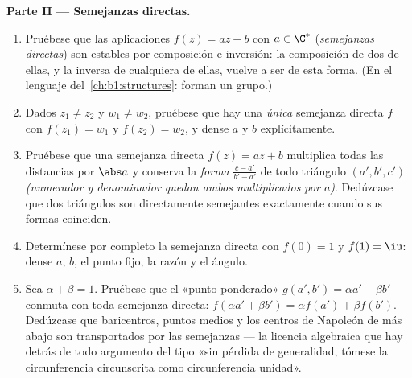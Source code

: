 \begin{problem}
\medskip
\noindent\textbf{Parte II --- Semejanzas directas.}
\begin{enumerate}[resume]
  \item Pruébese que las aplicaciones $f(z) = az + b$ con $a \in \C^*$
        (\emph{semejanzas directas}) son estables por composición e
        inversión: la composición de dos de ellas, y la inversa de
        cualquiera de ellas, vuelve a ser de esta forma. (En el
        lenguaje del~\cref{ch:b1:structures}: forman un grupo.)
  \item Dados $z_1 \neq z_2$ y $w_1 \neq w_2$, pruébese que hay una
        \emph{única} semejanza directa $f$ con $f(z_1) = w_1$ y
        $f(z_2) = w_2$, y dense $a$ y $b$ explícitamente.
  \item Pruébese que una semejanza directa $f(z) = az + b$ multiplica
        todas las distancias por $\abs a$ y conserva la \emph{forma}
        $\frac{c - a'}{b' - a'}$ de todo triángulo $(a', b', c')$
        \emph{(numerador y denominador quedan ambos multiplicados por
        $a$)}. Dedúzcase que dos triángulos son directamente semejantes
        exactamente cuando sus formas coinciden.
  \item Determínese por completo la semejanza directa con $f(0) = 1$ y
        $f(1) = \iu$: dense $a$, $b$, el punto fijo, la razón y el
        ángulo.
  \item Sea $\alpha + \beta = 1$. Pruébese que el «punto ponderado»
        $g(a', b') = \alpha a' + \beta b'$ conmuta con toda semejanza
        directa: $f(\alpha a' + \beta b') = \alpha f(a') + \beta f(b')$.
        Dedúzcase que baricentros, puntos medios y los centros de
        Napoleón de más abajo son transportados por las semejanzas ---
        la licencia algebraica que hay detrás de todo argumento del
        tipo «sin pérdida de generalidad, tómese la circunferencia
        circunscrita como circunferencia unidad».
\end{enumerate}


\end{problem}
